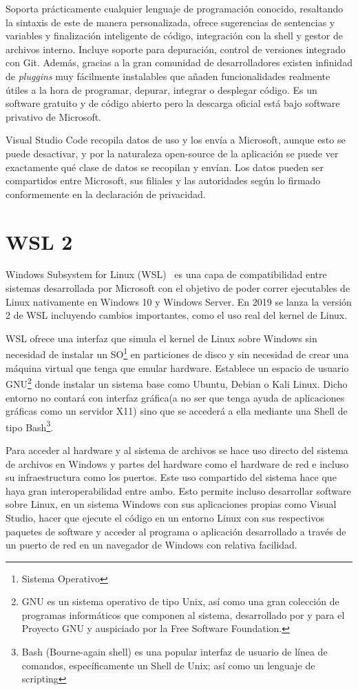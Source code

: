 \documentclass[a4paper, 12pt]{book}
\begin{document}
Soporta prácticamente cualquier lenguaje de programación conocido, resaltando la sintaxis de este de manera personalizada, ofrece sugerencias de sentencias y variables y finalización inteligente de código, integración con la shell y gestor de archivos interno. Incluye soporte para depuración, control de versiones integrado con Git. Además, gracias a la gran comunidad de desarrolladores existen infinidad de \emph{pluggins} muy fácilmente instalables que añaden funcionalidades realmente útiles a la hora de programar, depurar, integrar o desplegar código. 
Es un software gratuito y de código abierto pero la descarga oficial está bajo software privativo de Microsoft. 

Visual Studio Code recopila datos de uso y los envía a Microsoft, aunque esto se puede desactivar, y por la naturaleza open-source de la aplicación se puede ver exactamente qué clase de datos se recopilan y envían. Los datos pueden ser compartidos entre Microsoft, sus filiales y las autoridades según lo firmado conformemente en la declaración de privacidad. 

\section{WSL 2}
Windows Subsystem for Linux (WSL)~\cite{wsl2} es una capa de compatibilidad entre sistemas desarrollada por Microsoft con el objetivo de poder correr ejecutables de Linux nativamente en Windows 10 y Windows Server. En 2019 se lanza la versión 2 de WSL incluyendo cambios importantes, como el uso real del kernel de Linux. 

WSL ofrece una interfaz que simula el kernel de Linux sobre Windows sin necesidad de instalar un SO\footnote{Sistema Operativo} en particiones de disco y sin necesidad de crear una máquina virtual que tenga que emular hardware. Establece un espacio de usuario GNU\footnote{GNU es un sistema operativo de tipo Unix, así como una gran colección de programas informáticos que componen al sistema, desarrollado por y para el Proyecto GNU y auspiciado por la Free Software Foundation.} donde instalar un sistema base como Ubuntu, Debian o Kali Linux. Dicho entorno no contará con interfaz gráfica(a no ser que tenga ayuda de aplicaciones gráficas como un servidor X11) sino que se accederá a ella mediante una Shell de tipo Bash\footnote{Bash (Bourne-again shell) es una popular interfaz de usuario de línea de comandos, específicamente un Shell de Unix; así como un lenguaje de scripting}. 

Para acceder al hardware y al sistema de archivos se hace uso directo del sistema de archivos en Windows y partes del hardware como el hardware de red e incluso su infraestructura como los puertos. Este uso compartido del sistema hace que haya gran interoperabilidad entre ambo. Esto permite incluso desarrollar software sobre Linux, en un sistema Windows con sus aplicaciones propias como Visual Studio, hacer que ejecute el código en un entorno Linux con sus respectivos paquetes de software y acceder al programa o aplicación desarrollado a través de un puerto de red en un navegador de Windows con relativa facilidad. 
\end{document}
